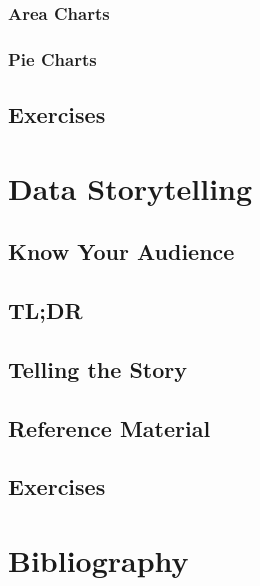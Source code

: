 \documentclass[]{book}
\begin{document}
\hypertarget{area-charts}{%
\subsection{Area Charts}\label{area-charts}}

\hypertarget{pie-charts}{%
\subsection{Pie Charts}\label{pie-charts}}

\hypertarget{exercises-12}{%
\section{Exercises}\label{exercises-12}}

\hypertarget{storytelling}{%
\chapter{Data Storytelling}\label{storytelling}}

\hypertarget{know-your-audience}{%
\section{Know Your Audience}\label{know-your-audience}}

\hypertarget{tldr}{%
\section{TL;DR}\label{tldr}}

\hypertarget{telling-the-story}{%
\section{Telling the Story}\label{telling-the-story}}

\hypertarget{reference-material}{%
\section{Reference Material}\label{reference-material}}

\hypertarget{exercises-13}{%
\section{Exercises}\label{exercises-13}}

\hypertarget{bibli}{%
\chapter{Bibliography}\label{bibli}}
\end{document}
